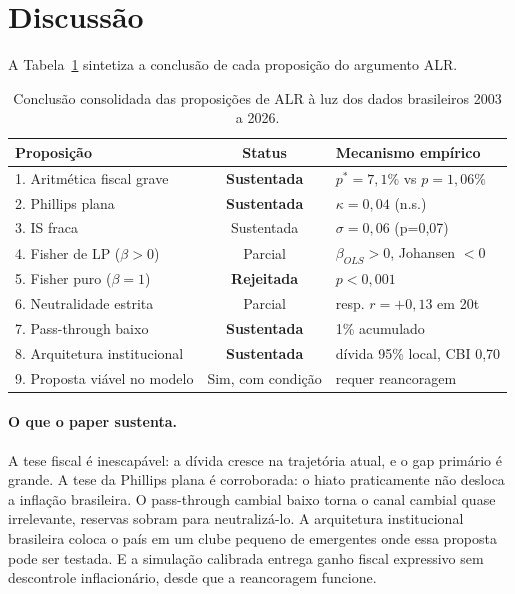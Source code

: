 \documentclass[11pt,a4paper]{article}
\begin{document}
\section{Discussão}\label{sec:disc}

A Tabela~\ref{tab:conclusao} sintetiza a conclusão de cada proposição do
argumento ALR.

\begin{table}[H]
\centering
\small
\begin{tabular}{lcl}
\toprule
Proposição & Status & Mecanismo empírico \\
\midrule
1. Aritmética fiscal grave & \textbf{Sustentada} & $p^* = 7{,}1\%$ vs $p = 1{,}06\%$ \\
2. Phillips plana & \textbf{Sustentada} & $\kappa = 0{,}04$ (n.s.) \\
3. IS fraca & Sustentada & $\sigma = 0{,}06$ (p=0,07) \\
4. Fisher de LP ($\beta > 0$) & Parcial & $\beta_{OLS}>0$, Johansen $<0$ \\
5. Fisher puro ($\beta = 1$) & \textbf{Rejeitada} & $p < 0{,}001$ \\
6. Neutralidade estrita & Parcial & resp. $r = +0{,}13$ em 20t \\
7. Pass-through baixo & \textbf{Sustentada} & 1\% acumulado \\
8. Arquitetura institucional & \textbf{Sustentada} & dívida 95\% local, CBI 0{,}70 \\
9. Proposta viável no modelo & Sim, com condição & requer reancoragem \\
\bottomrule
\end{tabular}
\caption{Conclusão consolidada das proposições de ALR à luz dos dados
brasileiros 2003 a 2026.}
\label{tab:conclusao}
\end{table}

\paragraph{O que o paper sustenta.} A tese fiscal é inescapável: a dívida
cresce na trajetória atual, e o gap primário é grande. A tese da Phillips
plana é corroborada: o hiato praticamente não desloca a inflação brasileira.
O pass-through cambial baixo torna o canal cambial quase irrelevante,
reservas sobram para neutralizá-lo. A arquitetura institucional brasileira
coloca o país em um clube pequeno de emergentes onde essa proposta pode
ser testada. E a simulação calibrada entrega ganho fiscal expressivo sem
descontrole inflacionário, desde que a reancoragem funcione.
\end{document}
